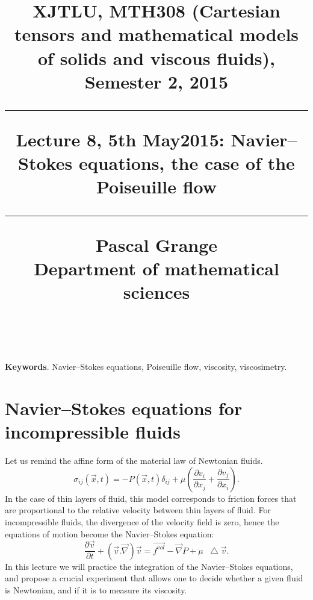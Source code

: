 \documentclass[DIV=12]{article}
\newcommand*\Laplace{\mathop{}\!\mathbin\bigtriangleup}
\newcommand{\fVol}{\vec{f^{vol}}}
\begin{document}
\title{
\noindent\hrulefill
\begin{flushleft}
{\Large \bf{XJTLU, MTH308 (Cartesian tensors and mathematical models of solids and viscous fluids), Semester 2, 2015\\
\vspace{8mm}
\hrule
\vspace{6mm}
 Lecture 8, 5th May2015: Navier--Stokes equations, the case of the Poiseuille flow}}
\vspace{8mm}
\hrule
\vspace{6mm}
{\Large{Pascal Grange\\
Department of mathematical sciences\\
{}\\
}}
\noindent\hrulefill
\end{flushleft}}
\date{}
\author{}
\maketitle
\vspace{-9mm}
 
{\bf{Keywords}}. Navier--Stokes equations, Poiseuille flow, viscosity, viscosimetry.\\
\vspace{3mm}

\tableofcontents 

\vspace{8mm}





\section{Navier--Stokes equations for incompressible fluids}

Let us remind the affine form of the material law of Newtonian fluids.
\begin{equation}
\sigma_{ij}( \vec{x}, t ) = -P(\vec{x}, t ) \delta_{ij}+ \mu\left( \frac{\partial v_i}{\partial x_j} + \frac{\partial v_j}{\partial x_i}\right).
 \label{sigmaNewton}
\end{equation}
 In the case of thin layers of fluid, this model corresponds to friction forces that are proportional to the relative velocity 
 between thin layers of fluid. For incompressible fluids, the divergence of the velocity field is zero, hence the 
 equations of motion become the Navier--Stokes equation:
 \begin{equation}
 \frac{\partial \vec{v}}{\partial t} + ( \vec{v}.\vec{\nabla}) \vec{v}= \fVol - \vec{\nabla} P + \mu \Laplace \vec{v}.
\label{NS}
 \end{equation}
In this lecture we will practice the integration of the Navier--Stokes equations,
 and propose a crucial experiment that allows one to decide whether a given fluid is Newtonian,
 and if it is to measure its viscosity.
\end{document}
